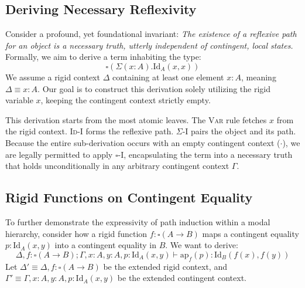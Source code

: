 \subsection{Deriving Necessary Reflexivity}
Consider a profound, yet foundational invariant: \textit{The existence of a reflexive path for an object is a necessary truth, utterly independent of contingent, local states.} Formally, we aim to derive a term inhabiting the type:
\[
\square \left(\Sigma(x:A). \mathrm{Id}_A(x, x)\right)
\]
We assume a rigid context $\Delta$ containing at least one element $x : A$, meaning $\Delta \equiv x:A$. Our goal is to construct this derivation solely utilizing the rigid variable $x$, keeping the contingent context strictly empty.

\begin{mathpar}
\end{mathpar}

This derivation starts from the most atomic leaves. The \textsc{Var} rule fetches $x$ from the rigid context. \textsc{Id-I} forms the reflexive path. \textsc{$\Sigma$-I} pairs the object and its path. Because the entire sub-derivation occurs with an empty contingent context ($\cdot$), we are legally permitted to apply \textsc{$\square$-I}, encapsulating the term into a necessary truth that holds unconditionally in any arbitrary contingent context $\Gamma$.

\subsection{Rigid Functions on Contingent Equality}
To further demonstrate the expressivity of path induction within a modal hierarchy, consider how a rigid function $f : \square (A \to B)$ maps a contingent equality $p : \mathrm{Id}_A(x,y)$ into a contingent equality in $B$. We want to derive:
\[
\Delta, f : \square (A \to B); \Gamma, x:A, y:A, p:\mathrm{Id}_A(x,y) \vdash \mathrm{ap}_f(p) : \mathrm{Id}_B(f(x), f(y))
\]
Let $\Delta' \equiv \Delta, f : \square (A \to B)$ be the extended rigid context, and $\Gamma' \equiv \Gamma, x:A, y:A, p:\mathrm{Id}_A(x,y)$ be the extended contingent context.

